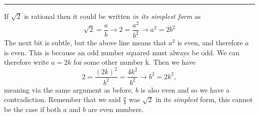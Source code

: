 \documentclass[10pt,a4paper]{article}
\begin{document}
\begin{itemize}
        \rule{\linewidth}{0.1mm}
        If $\sqrt{2}$ is rational then it could be written \textit{in its simplest form} as 
            \begin{equation} \label{eq:triple}
                \sqrt{2}=\frac{a}{b} \longrightarrow 2=\frac{a^2}{b^2} \longrightarrow a^2 = 2b^2
            \end{equation}
        The next bit is subtle, but the above line means that $a^2$ is even, and therefore $a$ is even. This is because an odd number squared must always be odd. We can therefore write $a=2k$ for some other number k. Then we have
            \begin{equation}
                2=\frac{(2k)^2}{b^2} = \frac{4k^2}{b^2} \longrightarrow b^2 = 2k^2, 
            \end{equation}
        meaning via the same argument as before, $b$ is also even and so we have a contradiction. Remember that we said $\frac{a}{b}$ was $\sqrt{2}$ in its \textit{simplest} form, this cannot be the case if both $a$ and $b$ are even numbers.
        

\end{itemize}
\end{document}
